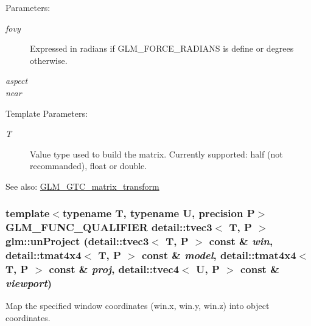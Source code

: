 \begin{Desc}
\item[Parameters:]
\begin{description}
\item[{\em fovy}]Expressed in radians if GLM\_\-FORCE\_\-RADIANS is define or degrees otherwise. \item[{\em aspect}]\item[{\em near}]\end{description}
\end{Desc}
\begin{Desc}
\item[Template Parameters:]
\begin{description}
\item[{\em T}]Value type used to build the matrix. Currently supported: half (not recommanded), float or double. \end{description}
\end{Desc}
\begin{Desc}
\item[See also:]\hyperlink{group__gtc__matrix__transform}{GLM\_\-GTC\_\-matrix\_\-transform} \end{Desc}
\hypertarget{group__gtc__matrix__transform_g90b6f19047316d870f88e0a50d8b13f3}{
\subsubsection[unProject]{\setlength{\rightskip}{0pt plus 5cm}template$<$typename T, typename U, precision P$>$ GLM\_\-FUNC\_\-QUALIFIER detail::tvec3$<$ T, P $>$ glm::unProject (detail::tvec3$<$ T, P $>$ const \& {\em win}, \/  detail::tmat4x4$<$ T, P $>$ const \& {\em model}, \/  detail::tmat4x4$<$ T, P $>$ const \& {\em proj}, \/  detail::tvec4$<$ U, P $>$ const \& {\em viewport})}}
\label{group__gtc__matrix__transform_g90b6f19047316d870f88e0a50d8b13f3}


Map the specified window coordinates (win.x, win.y, win.z) into object coordinates.

